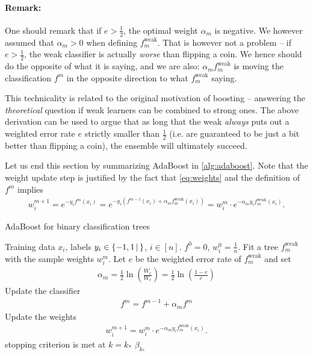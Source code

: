 \documentclass{article}
\newcommand{\set}[2]{\{ #1 \, \vert \, #2\}}
\newcommand{\weak}{\mathrm{weak}}
\begin{document}
\paragraph{Remark:} One should remark that if $e>\tfrac{1}{2}$, the optimal weight $\alpha_m$ is negative. We however assumed that $\alpha_m>0$ when defining $f_m^\weak$. That is however not a problem -- if $e>\tfrac{1}{2}$, the weak classifier is actually \emph{worse} than flipping a coin. We hence should do the opposite of what it is saying, and we are also: $\alpha_mf_m^\weak$ is moving the classification $f^m$ in the opposite direction to what $f_m^\weak$ saying.

This technicality is related to the original motivation of boosting -- answering the \emph{theoretical} question if weak learners can be combined to strong ones. The above derivation can be used to argue that as long that the weak \emph{always} puts out a weighted error rate $e$ strictly smaller than $\tfrac{1}{2}$ (i.e. are guaranteed to be just a bit better than flipping a coin), the ensemble will ultimately succeed. \newline

Let us end this section by summarizing AdaBoost in \eqref{alg:adaboost}. Note that the weight update step is justified by the fact that  \eqref{eq:weights} and the definition of $f^m$ implies 
\begin{align*}
    w_i^{m+1} =e^{-y_if^{m}(x_i)} = e^{-y_i(f^{m-1}(x_i)+\alpha_mf_m^\weak(x_i))} = w_i^m \cdot e^{-\alpha_m y_if_m^\weak (x_i)}.
\end{align*}

\begin{algorithm}[tb]      
	\caption{AdaBoost for binary classification trees} 
	\label{alg:adaboost}
	\begin{algorithmic} [1]
 		\REQUIRE Training data $x_i$, labels $y_i \in \set{-1,1}$, $i\in [n]$.
 		\STATE $f^0=0$, $w_i^0 = \tfrac{1}{n}$.
 		\REPEAT
 			\STATE Fit a tree $f_m^\weak$ with the sample weights $w_i^{m}$.
            \STATE Let $e$ be the weighted error rate of $f_m^\weak$ and set 
            \begin{align*}
                \alpha_m =  \frac{1}{2}\ln\left(\frac{W_c}{W_e}\right) = \frac{1}{2}\ln\left(\frac{1-e}{e}\right)
            \end{align*}
            \STATE Update the classifier
            \begin{align*}
                f^m = f^{m-1}+\alpha_m f^m
            \end{align*}
            \STATE Update the weights
            \begin{align*}
                w_i^{m+1} = w_i^{m}\cdot e^{-\alpha_m y_if_m^\weak (x_i)}.
            \end{align*}
 		\UNTIL stopping criterion is met at $k= k_*$
 		\RETURN $\beta_{k_*}$
	\end{algorithmic}
\end{algorithm}
\end{document}
